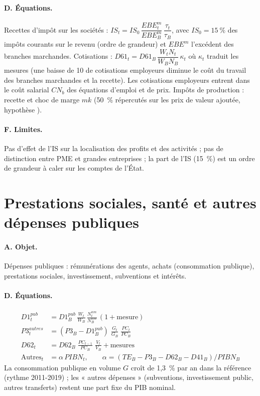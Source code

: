 \paragraph{D. Équations.} Recettes d'impôt sur les sociétés :
$IS_t = IS_0\,\dfrac{EBE^m_t}{EBE^m_B}\,\dfrac{\tau_t}{\tau_B}$, avec $IS_0 = 15~\%$ des impôts courants sur le revenu
(ordre de grandeur) et $EBE^m$ l'excédent des branches marchandes. Cotisations : $D61_t = D61_B\,\dfrac{W_tN_t}{W_BN_B}\,\kappa_t$
où $\kappa_t$ traduit les mesures (une baisse de 10\md{} de cotisations employeurs diminue le coût du travail des
branches marchandes et la recette). Les cotisations employeurs entrent dans le coût salarial $CN_b$ des équations
d'emploi et de prix. Impôts de production : recette et choc de marge $mk$ (50~\% répercutés sur les prix de valeur
ajoutée, hypothèse ).

\paragraph{F. Limites.} Pas d'effet de l'IS sur la localisation des profits et des activités ; pas de distinction
entre PME et grandes entreprises ; la part de l'IS (15~\%) est un ordre de grandeur à caler sur les comptes de l'État.

\section{Prestations sociales, santé et autres dépenses publiques}
\label{sec:depenses}

\paragraph{A. Objet.} Dépenses publiques : rémunérations des agents, achats (consommation publique), prestations
sociales, investissement, subventions et intérêts.

\paragraph{D. Équations.}
\begin{align}
D1^{pub}_t &= D1^{pub}_B\,\frac{W_t}{W_B}\,\frac{N^{nm}_t}{N^{nm}_B}\,(1+\text{mesure}) \\
P3^{autres}_t &= (P3_B - D1^{pub}_B)\;\frac{G_t}{G_B}\;\frac{PC_t}{PC_B} \\
D62_t &= D62_B\;\frac{PC_{t-1}}{PC_B}\;\frac{V_t}{V_B} + \text{mesures} \\
\text{Autres}_t &= \alpha\,PIBN_t,\qquad \alpha = (TE_B - P3_B - D62_B - D41_B)/PIBN_B
\end{align}
La consommation publique en volume $G$ croît de 1,3~\% par an dans la référence (rythme 2011-2019) ; les « autres
dépenses » (subventions, investissement public, autres transferts) restent une part fixe du PIB nominal.

